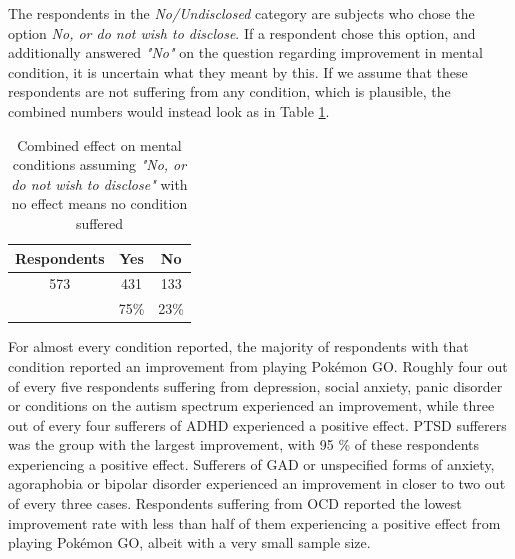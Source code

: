 The respondents in the \emph{No/Undisclosed} category are subjects who chose the option \emph{No, or do not wish to disclose}. If a respondent chose this option, and additionally answered \emph{"No"} on the question regarding improvement in mental condition, it is uncertain what they meant by this. If we assume that these respondents are not suffering from any condition, which is plausible, the combined numbers would instead look as in Table \ref{tbl:mental-conditions-without-undisclosed-no}.

\begin{table}[h]
	\centering
	\caption{Combined effect on mental conditions assuming \emph{"No, or do not wish to disclose"} with no effect means no condition suffered}
	\label{tbl:mental-conditions-without-undisclosed-no}
	\begin{tabular}{|c|c|c|}
		\hline
		\textbf{Respondents} & \textbf{Yes} & \textbf{No}\\
		\hline\hline
		573		& 431		& 133\\
		& 75\%		& 23\%\\\hline
	\end{tabular}
\end{table}

For almost every condition reported, the majority of respondents with that condition reported an improvement from playing Pokémon GO. Roughly four out of every five respondents suffering from depression, social anxiety, panic disorder or conditions on the autism spectrum experienced an improvement, while three out of every four sufferers of ADHD experienced a positive effect. PTSD sufferers was the group with the largest improvement, with 95 \% of these respondents experiencing a positive effect. Sufferers of GAD or unspecified forms of anxiety, agoraphobia or bipolar disorder experienced an improvement in closer to two out of every three cases. Respondents suffering from OCD reported the lowest improvement rate with less than half of them experiencing a positive effect from playing Pokémon GO, albeit with a very small sample size. 

